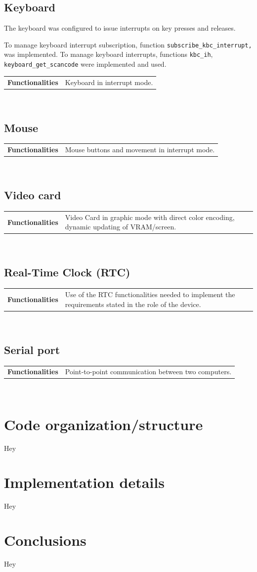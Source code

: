 \documentclass{article}
\theoremstyle{remark}
\newcommand{\func}[1]{
\begin{tabular}{l l}
	\begin{minipage}[t]{30mm} \textbf{Functionalities} \end{minipage} &
	\begin{minipage}[t]{125mm} #1 \end{minipage}
\end{tabular}\\
}
\begin{document}
\subsection{Keyboard}
The keyboard was configured to issue interrupts on key presses and releases.

To manage keyboard interrupt subscription, function \texttt{subscribe\_kbc\_interrupt, } was implemented. To manage keyboard interrupts, functions \texttt{kbc\_ih}, \texttt{keyboard\_get\_scancode} were implemented and used. 

\func{Keyboard in interrupt mode.}
\subsection{Mouse}
\func{Mouse buttons and movement in interrupt mode.}
\subsection{Video card}
\func{Video Card in graphic mode with direct color encoding, dynamic updating of VRAM/screen.}
\subsection{Real-Time Clock (RTC)}
\func{Use of the RTC functionalities needed to implement the requirements stated in the role of the device.}
\subsection{Serial port}
\func{Point-to-point communication between two computers.}
\pagebreak
\section{Code organization/structure}
Hey
\section{Implementation details}
Hey
\section{Conclusions}
Hey
\end{document}
